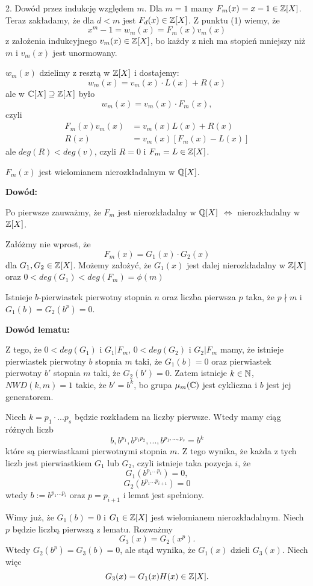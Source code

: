 2. Dowód przez indukcję względem $m$. Dla $m=1$ mamy $F_m(x)=x-1\in\mathbb{Z}[X]$. Teraz zakładamy, że dla $d<m$ jest $F_d(x)\in\mathbb{Z}[X]$. Z punktu (1) wiemy, że
$$x^m-1=w_m(x)=F_m(x)v_m(x)$$
z założenia indukcyjnego $v_m(x)\in\mathbb{Z}[X]$, bo każdy z nich ma stopień mniejszy niż $m$ i $v_m(x)$ jest unormowany.

$w_m(x)$ dzielimy z resztą w $\mathbb{Z}[X]$ i dostajemy:
$$w_m(x)=v_m(x)\cdot L(x)+R(x)$$
ale w $\mathbb{C}[X]\supseteq\mathbb{Z}[X]$ było
$$w_m(x)=v_m(x)\cdot F_m(x),$$
czyli 
\begin{align*}
    F_m(x)v_m(x)&=v_m(x)L(x)+R(x)\\
    R(x)&=v_m(x)[F_m(x)-L(x)]
\end{align*}
ale $deg(R)<deg(v)$, czyli $R=0$ i $F_m=L\in\mathbb{Z}[X]$.

\begin{uwaga}[$F_m$ nierozkładalny w $\Q$]
    $F_m(x)$ jest wielomianem nierozkładalnym w $\mathbb{Q}[X]$.
\end{uwaga}

\textbf{Dowód:} 

Po pierwsze zauważmy, że $F_m$ jest nierozkładalny w $\mathbb{Q}[X]$ $\iff$ nierozkładalny w $\mathbb{Z}[X]$. 

Załóżmy nie wprost, że
$$F_m(x)=G_1(x)\cdot G_2(x)$$
dla $G_1,G_2\in\mathbb{Z}[X]$. Możemy założyć, że $G_1(x)$ jest dalej nierozkładalny w $\mathbb{Z}[X]$ oraz $0<deg(G_1)<deg(F_m)=\phi(m)$

 Istnieje $b$-pierwiastek pierwotny stopnia $n$ oraz liczba pierwsza $p$ taka, że $p\nmid m$ i $G_1(b)=G_2(b^p)=0$.

\textbf{Dowód lematu:}

Z tego, że $0<deg(G_1)$ i $G_1|F_m$, $0<deg(G_2)$ i $G_2|F_m$ mamy, że istnieje pierwiastek pierwotny $b$ stopnia $m$ taki, że $G_1(b)=0$ oraz pierwiastek pierwotny $b'$ stopnia $m$ taki, że $G_2(b')=0$. Zatem istnieje $k\in\mathbb{N}$, $NWD(k, m)=1$ takie, że $b'=b^k$, bo grupa $\mu_m(\mathbb{C})$ jest cykliczna i $b$ jest jej generatorem.

Niech $k=p_1\cdot...p_s$ będzie rozkładem na liczby pierwsze. Wtedy mamy ciąg różnych liczb
$$b, b^{p_1},b^{p_1p_2},...,b^{p_1,...,p_s}=b^k$$
które są pierwiastkami pierwotnymi stopnia $m$. Z tego wynika, że każda z tych liczb jest pierwiastkiem $G_1$ lub $G_2$, czyli istnieje taka pozycja $i$, że
$$G_1(b^{p_1...p_i})=0,$$
$$G_2(b^{p_1...p_{i+1}})=0$$
wtedy $b:=b^{p_1...p_i}$ oraz $p=p_{i+1}$ i lemat jest spełniony.
\medskip

Wimy już, że $G_1(b)=0$ i $G_1\in\mathbb{Z}[X]$ jest wielomianem nierozkładalnym. Niech $p$ będzie liczbą pierwszą z lematu. Rozważmy
$$G_3(x)=G_2(x^p).$$
Wtedy $G_2(b^p)=G_3(b)=0$, ale stąd wynika, że $G_1(x)$ dzieli $G_3(x)$. Niech więc 
$$G_3(x)=G_1(x)H(x)\in\mathbb{Z}[X].$$

